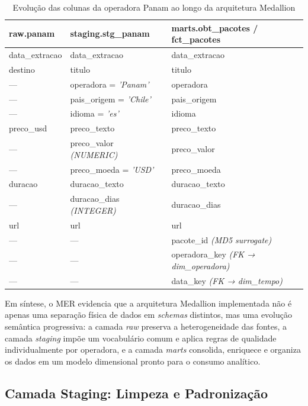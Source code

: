 \begin{table}[H]
\centering
\caption{Evolução das colunas da operadora Panam ao longo da arquitetura Medallion}
\label{tab:mer_colunas}
\begin{tabular}{|p{3.5cm}|p{3.5cm}|p{5.5cm}|}
\hline
\textbf{raw.panam} & \textbf{staging.stg\_panam} & \textbf{marts.obt\_pacotes / fct\_pacotes} \\ \hline
data\_extracao & data\_extracao & data\_extracao \\ \hline
destino & titulo & titulo \\ \hline
— & operadora = \textit{'Panam'} & operadora \\ \hline
— & pais\_origem = \textit{'Chile'} & pais\_origem \\ \hline
— & idioma = \textit{'es'} & idioma \\ \hline
preco\_usd & preco\_texto & preco\_texto \\ \hline
— & preco\_valor \textit{(NUMERIC)} & preco\_valor \\ \hline
— & preco\_moeda = \textit{'USD'} & preco\_moeda \\ \hline
duracao & duracao\_texto & duracao\_texto \\ \hline
— & duracao\_dias \textit{(INTEGER)} & duracao\_dias \\ \hline
url & url & url \\ \hline
— & — & pacote\_id \textit{(MD5 surrogate)} \\ \hline
— & — & operadora\_key \textit{(FK → dim\_operadora)} \\ \hline
— & — & data\_key \textit{(FK → dim\_tempo)} \\ \hline
\end{tabular}
\end{table}

Em síntese, o MER evidencia que a arquitetura Medallion implementada não é apenas
uma separação física de dados em \textit{schemas} distintos, mas uma evolução
semântica progressiva: a camada \textit{raw} preserva a heterogeneidade das fontes,
a camada \textit{staging} impõe um vocabulário comum e aplica regras de qualidade
individualmente por operadora, e a camada \textit{marts} consolida, enriquece e
organiza os dados em um modelo dimensional pronto para o consumo analítico.



\subsection{Camada Staging: Limpeza e Padronização}

